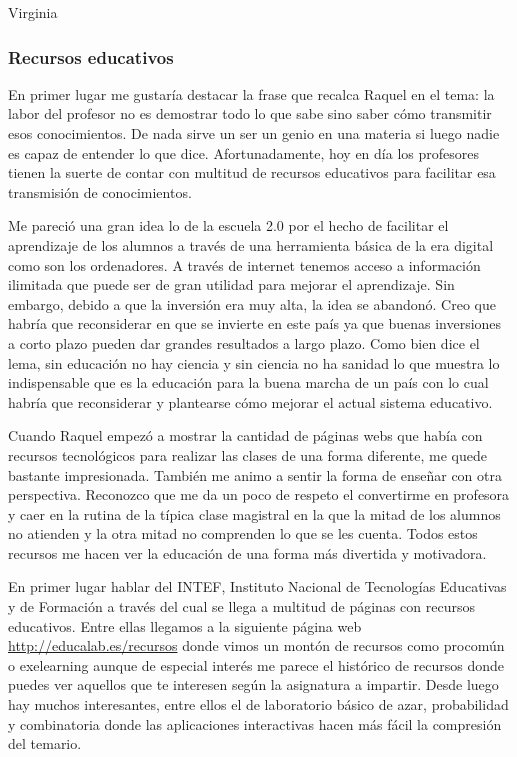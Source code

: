 \begin{opin}{\virgicolor}{Virginia}


\subsubsection{Recursos educativos}

En primer lugar me gustaría destacar la frase que recalca Raquel en el tema: la labor del profesor no es demostrar todo lo que sabe sino saber cómo transmitir esos conocimientos. De nada sirve un ser un genio en una materia si luego nadie es capaz de entender lo que dice. Afortunadamente, hoy en día los profesores tienen la suerte de contar con multitud de recursos educativos para facilitar esa transmisión de conocimientos.

Me pareció una gran idea lo de la escuela 2.0 por el hecho de facilitar el aprendizaje de los alumnos a través de una herramienta básica de la era digital como son los ordenadores. A través de internet tenemos acceso a información ilimitada que puede ser de gran utilidad para mejorar el aprendizaje. Sin embargo, debido a que la inversión era muy alta, la idea se abandonó. Creo que habría que reconsiderar en que se invierte en este país ya que buenas inversiones a corto plazo pueden dar grandes resultados a largo plazo. Como bien dice el lema, sin educación no hay ciencia y sin ciencia no ha sanidad lo que muestra lo indispensable que es la educación para la buena marcha de un país con lo cual habría que reconsiderar y plantearse cómo mejorar el actual sistema educativo.

Cuando Raquel empezó a mostrar la cantidad de páginas webs que había con recursos tecnológicos para realizar las clases de una forma diferente, me quede bastante impresionada. También me animo a sentir la forma de enseñar con otra perspectiva. Reconozco que me da un poco de respeto el convertirme en profesora y caer en la rutina de la típica clase magistral en la que la mitad de los alumnos no atienden y la otra mitad no comprenden lo que se les cuenta. Todos estos recursos me hacen ver la educación de una forma más divertida y motivadora.

En primer lugar hablar del INTEF, Instituto Nacional de Tecnologías Educativas y de Formación a través del cual se llega a multitud de páginas con recursos educativos. Entre ellas llegamos a la siguiente página web \url{http://educalab.es/recursos} donde vimos un montón de recursos como procomún o exelearning aunque de especial interés me parece el histórico de recursos donde puedes ver aquellos que te interesen según la asignatura a impartir. Desde luego hay muchos interesantes, entre ellos el de laboratorio básico de azar, probabilidad y combinatoria donde las aplicaciones interactivas hacen más fácil la compresión del temario.


\end{opin}
